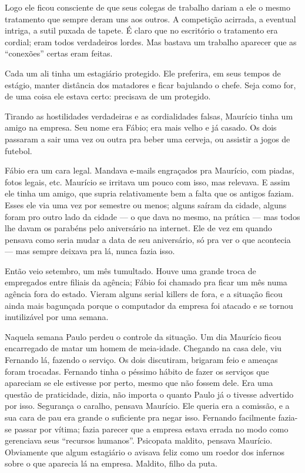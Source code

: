 Logo ele ficou consciente de que seus colegas de trabalho dariam a ele o mesmo tratamento que sempre deram uns aos outros. A competição acirrada, a eventual intriga, a sutil puxada de tapete. É claro que no escritório o tratamento era cordial; eram todos verdadeiros lordes. Mas bastava um trabalho aparecer que as “conexões” certas eram feitas.

Cada um ali tinha um estagiário protegido. Ele preferira, em seus tempos de estágio, manter distância dos matadores e ficar bajulando o chefe. Seja como for, de uma coisa ele estava certo: precisava de um protegido.

Tirando as hostilidades verdadeiras e as cordialidades falsas, Maurício tinha um amigo na empresa. Seu nome era Fábio; era mais velho e já casado. Os dois passaram a sair uma vez ou outra pra beber uma cerveja, ou assistir a jogos de futebol.

Fábio era um cara legal. Mandava e-mails engraçados pra Maurício, com piadas, fotos legais, etc. Maurício se irritava um pouco com isso, mas relevava. E assim ele tinha um amigo, que supria relativamente bem a falta que os antigos faziam. Esses ele via uma vez por semestre ou menos; alguns saíram da cidade, alguns foram pro outro lado da cidade --- o que dava no mesmo, na prática --- mas todos lhe davam os pa\-ra\-béns pelo aniversário na internet. Ele de vez em quando pensava como seria mudar a data de seu aniversário, só pra ver o que acontecia --- mas sempre deixava pra lá, nunca fazia isso.

Então veio setembro, um mês tumultado. Houve uma gran\-de troca de empregados entre filiais da agência; Fábio foi chamado pra ficar um mês numa agência fora do estado. Vieram alguns \foreignlanguage{english}{serial killers} de fora, e a situação ficou ainda mais bagunçada porque o computador da empresa foi atacado e se tornou inutilizável por uma semana.

Naquela semana Paulo perdeu o controle da situação. Um dia Maurício ficou encarregado de matar um homem de meia-idade. Chegando na casa dele, viu Fernando lá, fazendo o serviço. Os dois discutiram, brigaram feio e ameaças foram trocadas. Fernando tinha o péssimo hábito de fazer os serviços que apareciam se ele estivesse por perto, mesmo que não fossem dele. Era uma questão de praticidade, dizia, não importa o quanto Paulo já o tivesse advertido por isso. Segurança o caralho, pensava Maurício. Ele queria era a comissão, e a sua cara de pau era grande o suficiente pra negar isso. Fernando facilmente fazia-se passar por vítima; fazia parecer que a empresa estava errada no modo como gerenciava seus ``recursos humanos''. Psicopata maldito, pensava Maurício. Obviamente que algum estagiário o avisava feliz como um roedor dos infernos sobre o que aparecia lá na empresa. Maldito, filho da puta.

